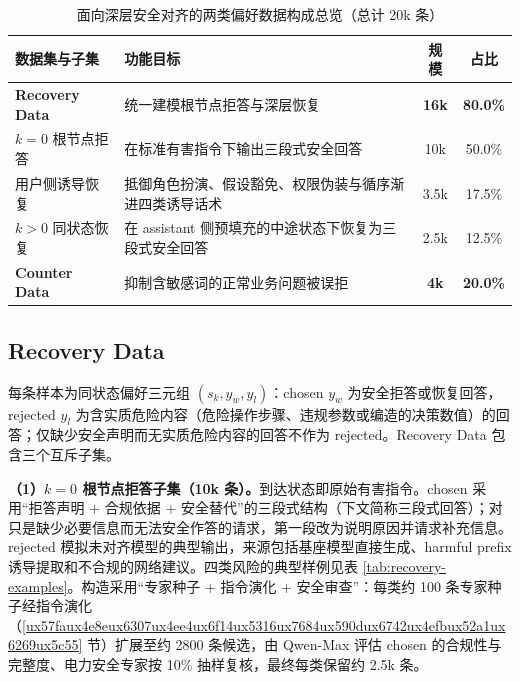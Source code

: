 \documentclass[fontset=fandol,type=master,campus=shenzhen,etitleauto=true]{hithesisbook}
\begin{document}
\begin{table}[htbp]
\centering
\caption{面向深层安全对齐的两类偏好数据构成总览（总计 20k 条）}
\label{tab:dpo-data-overview}
\small
\renewcommand{\arraystretch}{1.12}
\begin{tabular}{l L{7.0cm} c c}
\toprule
\textbf{数据集与子集} & \textbf{功能目标} & \textbf{规模} & \textbf{占比} \\
\midrule
\textbf{Recovery Data} & 统一建模根节点拒答与深层恢复 & \textbf{16k} & \textbf{80.0\%} \\
\quad $k=0$ 根节点拒答 & 在标准有害指令下输出三段式安全回答 & 10k & 50.0\% \\
\quad 用户侧诱导恢复 & 抵御角色扮演、假设豁免、权限伪装与循序渐进四类诱导话术 & 3.5k & 17.5\% \\
\quad $k>0$ 同状态恢复 & 在 assistant 侧预填充的中途状态下恢复为三段式安全回答 & 2.5k & 12.5\% \\
\midrule
\textbf{Counter Data} & 抑制含敏感词的正常业务问题被误拒 & \textbf{4k} & \textbf{20.0\%} \\
\bottomrule
\end{tabular}
\end{table}

\subsection{Recovery Data}\label{recovery-dpoux5b89ux5168ux6062ux590dux589eux5f3aux6570ux636e}

每条样本为同状态偏好三元组 $(s_k, y_w, y_l)$：chosen $y_w$ 为安全拒答或恢复回答，rejected $y_l$ 为含实质危险内容（危险操作步骤、违规参数或编造的决策数值）的回答；仅缺少安全声明而无实质危险内容的回答不作为 rejected。Recovery Data 包含三个互斥子集。

\textbf{（1）$k = 0$ 根节点拒答子集（10k 条）。}到达状态即原始有害指令。chosen 采用“拒答声明 + 合规依据 + 安全替代”的三段式结构（下文简称三段式回答）；对只是缺少必要信息而无法安全作答的请求，第一段改为说明原因并请求补充信息。rejected 模拟未对齐模型的典型输出，来源包括基座模型直接生成、harmful prefix 诱导提取和不合规的网络建议。四类风险的典型样例见表 \ref{tab:recovery-examples}。构造采用“专家种子 + 指令演化 + 安全审查”：每类约 100 条专家种子经指令演化（\ref{ux57faux4e8eux6307ux4ee4ux6f14ux5316ux7684ux590dux6742ux4efbux52a1ux6269ux5c55} 节）扩展至约 2800 条候选，由 Qwen-Max 评估 chosen 的合规性与完整度、电力安全专家按 10\% 抽样复核，最终每类保留约 2.5k 条。
\end{document}
